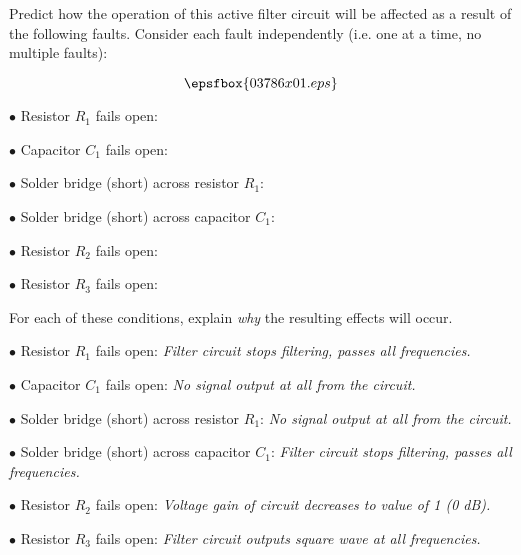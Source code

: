 

Predict how the operation of this active filter circuit will be affected as a result of the following faults.  Consider each fault independently (i.e. one at a time, no multiple faults):

$$\epsfbox{03786x01.eps}$$

\medskip
\item{$\bullet$} Resistor $R_1$ fails open:
\vskip 5pt
\item{$\bullet$} Capacitor $C_1$ fails open:
\vskip 5pt
\item{$\bullet$} Solder bridge (short) across resistor $R_1$:
\vskip 5pt
\item{$\bullet$} Solder bridge (short) across capacitor $C_1$:
\vskip 5pt
\item{$\bullet$} Resistor $R_2$ fails open:
\vskip 5pt
\item{$\bullet$} Resistor $R_3$ fails open:
\medskip

For each of these conditions, explain {\it why} the resulting effects will occur.







\medskip
\item{$\bullet$} Resistor $R_1$ fails open: {\it Filter circuit stops filtering, passes all frequencies.}
\vskip 5pt
\item{$\bullet$} Capacitor $C_1$ fails open: {\it No signal output at all from the circuit.}
\vskip 5pt
\item{$\bullet$} Solder bridge (short) across resistor $R_1$: {\it No signal output at all from the circuit.}
\vskip 5pt
\item{$\bullet$} Solder bridge (short) across capacitor $C_1$: {\it Filter circuit stops filtering, passes all frequencies.}
\vskip 5pt
\item{$\bullet$} Resistor $R_2$ fails open: {\it Voltage gain of circuit decreases to value of 1 (0 dB).}
\vskip 5pt
\item{$\bullet$} Resistor $R_3$ fails open: {\it Filter circuit outputs square wave at all frequencies.}
\medskip






